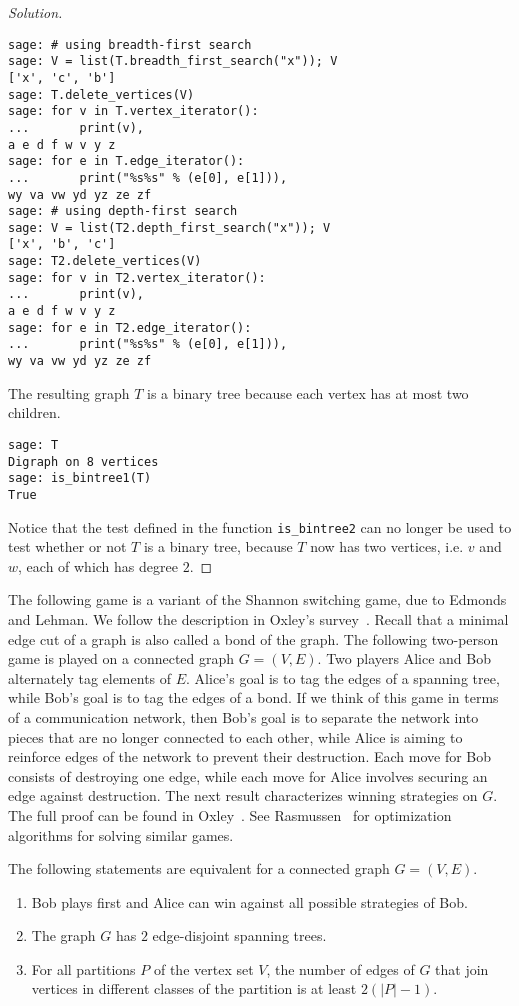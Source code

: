 \begin{proof}[Solution]
\begin{lstlisting}
sage: # using breadth-first search
sage: V = list(T.breadth_first_search("x")); V
['x', 'c', 'b']
sage: T.delete_vertices(V)
sage: for v in T.vertex_iterator():
...       print(v),
a e d f w v y z
sage: for e in T.edge_iterator():
...       print("%s%s" % (e[0], e[1])),
wy va vw yd yz ze zf
sage: # using depth-first search
sage: V = list(T2.depth_first_search("x")); V
['x', 'b', 'c']
sage: T2.delete_vertices(V)
sage: for v in T2.vertex_iterator():
...       print(v),
a e d f w v y z
sage: for e in T2.edge_iterator():
...       print("%s%s" % (e[0], e[1])),
wy va vw yd yz ze zf
\end{lstlisting}
The resulting graph $T$ is a binary tree because each vertex has at
most two children.
\begin{lstlisting}
sage: T
Digraph on 8 vertices
sage: is_bintree1(T)
True
\end{lstlisting}
Notice that the test defined in the function \verb!is_bintree2! can no
longer be used to test whether or not $T$ is a binary tree, because
$T$ now has two vertices, i.e. $v$ and $w$, each of which has degree $2$.
\end{proof}

The following game is a variant of the Shannon
switching game, due to Edmonds and
Lehman. We follow the description
in Oxley's survey~\cite{Oxley2003}. Recall that a
minimal edge cut of a graph is also called a bond of the
graph. The following two-person game is played on a connected graph
$G = (V,E)$. Two players Alice and Bob alternately tag elements of
$E$. Alice's goal is to tag the edges of a spanning tree, while Bob's
goal is to tag the edges of a bond. If we think of this game in terms
of a communication network, then Bob's goal is to separate the network
into pieces that are no longer connected to each other, while Alice is
aiming to reinforce edges of the network to prevent their
destruction. Each move for Bob consists of destroying one edge, while
each move for Alice involves securing an edge against destruction. The
next result characterizes winning strategies on $G$. The full proof
can be found in Oxley~\cite{Oxley2003}. See
Rasmussen~\cite{Rasmussen2007} for
optimization algorithms for solving
similar games.

\begin{theorem}
The following statements are equivalent for a connected graph
$G = (V, E)$.
\begin{enumerate}
\item Bob plays first and Alice can win against all possible
  strategies of Bob.

\item The graph $G$ has $2$ edge-disjoint spanning trees.

\item For all partitions $P$ of the vertex set $V$, the number of
  edges of $G$ that join vertices in different classes of the
  partition is at least $2(|P| - 1)$.
\end{enumerate}
\end{theorem}


